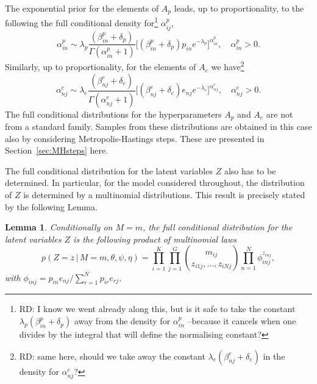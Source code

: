 \documentclass[11pt]{amsart}
\newtheorem{lemma}{Lemma}
\theoremstyle{definition}
\theoremstyle{remark}
\begin{document}
The exponential prior for the elements of $A_p$ leads, up to
proportionality, to the following the full conditional density
for\footnote{RD: I know we went already along this, but is it safe to
  take the constant $\lambda_p(\beta_{in}^p + \delta_p)$ away from the
density for $\alpha_{in}^p$ --because it cancels when one divides by
the integral that will define the normalising constant?}  
$\alpha_{ij}^p$,
\begin{equation}
 \label{eqn:Full_for_Ap}
  \alpha_{in}^p 
  \sim 
  \lambda_p\frac{(\beta_{in}^p + \delta_p)}{\Gamma(\alpha_{in}^p + 1)} 
   \Big[(\beta_{in}^p + \delta_p)p_{in}
   e^{-\lambda_p}\Big]^{\alpha_{in}^p}, \tag{$s_6$}
   \quad  \alpha_{in}^p > 0.
\end{equation}
Similarly, up to proportionality, for the elements of $A_e$ we
have\footnote{RD: same here, should we take away the constant
  $\lambda_e(\beta_{nj}^e + \delta_e)$ in the density for
  $\alpha_{nj}^e$?}
\begin{equation}
 \label{eqn:Full_for_Ae}
  \alpha_{nj}^e 
  \sim
  \lambda_e\frac{(\beta_{nj}^e + \delta_e)}{\Gamma(\alpha_{nj}^e + 1)} 
   \Big[(\beta_{nj}^e + \delta_e)e_{nj}
   e^{-\lambda_e}\Big]^{\alpha_{nj}^e}, 
   \quad  \alpha_{nj}^e > 0. \tag{$s_7$}
\end{equation}
The full conditional distributions for the hyperparameters $A_p$ and
$A_e$ are not from a standard family. Samples from these distributions
are obtained in this case also  by considering Metropolis-Hastings
steps. These are presented in Section~\ref{sec:MHsteps} here.


The full conditional distribution for the latent variables $Z$ also
has to be determined. In particular, for the model considered
throughout, the distribution of $Z$ is determined by a multinomial
distributions. This result is precisely stated by the following
Lemma.

\begin{lemma} Conditionally on  $M= m$, the full conditional
  distribution for the latent variables $Z$ is the following product
  of multinomial laws 
\[
   p(Z = z\,|\, M=m, \theta, \psi, \eta) 
   = 
   \prod_{i=1}^K\prod_{j=1}^G {m_{ij} \choose z_{i1j}, \ldots,
     z_{iNj}} 
   \prod_{n=1}^N \phi_{inj}^{z_{inj}},
\]
with $\phi_{inj} = p_{in} e_{nj}/\sum_{r=1}^N p_{ir}e_{rj}$.
\end{lemma}
\end{document}

